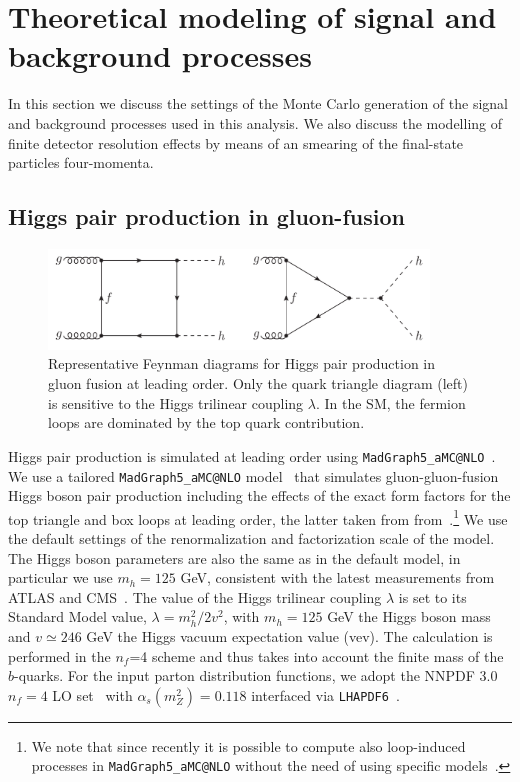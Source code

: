 

\section{Theoretical modeling of signal and background processes}
\label{mcgeneration}

In this section we discuss the settings of the
Monte Carlo generation of the signal and background
processes used in this analysis.
%
We also discuss the modelling of finite detector
resolution effects by means of an smearing of the final-state
particles four-momenta.

\subsection{Higgs pair production in gluon-fusion}


\begin{figure}[t]
\begin{center}
  \includegraphics[width=0.90\textwidth]{plots/hhFeyn.pdf}
  \caption{\small Representative Feynman diagrams
    for Higgs pair production in gluon fusion at
    leading order.
    Only the quark triangle diagram (left) is sensitive to the Higgs trilinear coupling
    $\lambda$.
    In the SM, the fermion loops are dominated by the top quark contribution.
}
\label{fig:hhFeyn}
\end{center}
\end{figure}

Higgs pair production is simulated at leading order using
{\tt MadGraph5\_aMC@NLO}~\cite{Alwall:2014hca}.
%
We use a tailored {\tt MadGraph5\_aMC@NLO} model~\cite{Maltoni:2014eza} that simulates
gluon-gluon-fusion Higgs boson pair production including the effects
of the
exact form factors for the top triangle and box loops at leading
order, the latter taken from from~\cite{Plehn:1996wb}.\footnote{We note that
  since recently it is possible to compute also
  loop-induced processes in {\tt MadGraph5\_aMC@NLO} without the need of
  using specific
models~\cite{Hirschi:2015iia}.}
%
We use the default settings of the renormalization and factorization
scale of the model.
%
The Higgs boson parameters are also the same as in the default model,
in particular we use $m_h=125$ GeV, consistent with the latest
measurements from ATLAS and CMS~\cite{Aad:2014aba,Khachatryan:2014jba}.
%
The value of the Higgs trilinear coupling $\lambda$ is set to its
Standard Model value, $\lambda=m_h^2/2v^2$, with $m_h=125$ GeV
the Higgs boson mass and $v\simeq 246$ GeV the Higgs vacuum expectation
value (vev).
%
The calculation is performed in the
$n_f$=4 scheme and thus
takes into account the finite mass of the $b$-quarks.
%
For the input parton distribution functions, we 
adopt the NNPDF 3.0 $n_f = 4$ LO set~\cite{Ball:2014uwa} with
$\alpha_s(m_Z^2)=0.118$
interfaced via {\tt LHAPDF6}~\cite{Buckley:2014ana}.

